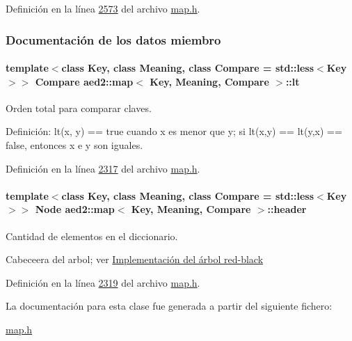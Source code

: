 \-Definición en la línea \hyperlink{map_8h_source_l02573}{2573} del archivo \hyperlink{map_8h_source}{map.\-h}.



\subsubsection{\-Documentación de los datos miembro}
\hypertarget{classaed2_1_1map_a0e5be36fae0693e4665bd2a615e7550a_a0e5be36fae0693e4665bd2a615e7550a}{
\paragraph[{lt}]{\setlength{\rightskip}{0pt plus 5cm}template$<$class \-Key, class \-Meaning, class \-Compare = std\-::less$<$\-Key$>$$>$ \-Compare {\bf aed2\-::map}$<$ \-Key, \-Meaning, \-Compare $>$\-::{\bf lt}}}\label{classaed2_1_1map_a0e5be36fae0693e4665bd2a615e7550a_a0e5be36fae0693e4665bd2a615e7550a}


\-Orden total para comparar claves. 

\-Definición\-: lt(x, y) == true cuando x es menor que y; si lt(x,y) == lt(y,x) == false, entonces x e y son iguales. 

\-Definición en la línea \hyperlink{map_8h_source_l02317}{2317} del archivo \hyperlink{map_8h_source}{map.\-h}.

\hypertarget{classaed2_1_1map_a92d93f905c8ad73fba18fdc7e8915cce_a92d93f905c8ad73fba18fdc7e8915cce}{
\paragraph[{header}]{\setlength{\rightskip}{0pt plus 5cm}template$<$class \-Key, class \-Meaning, class \-Compare = std\-::less$<$\-Key$>$$>$ {\bf \-Node} {\bf aed2\-::map}$<$ \-Key, \-Meaning, \-Compare $>$\-::{\bf header}}}\label{classaed2_1_1map_a92d93f905c8ad73fba18fdc7e8915cce_a92d93f905c8ad73fba18fdc7e8915cce}


\-Cantidad de elementos en el diccionario. 

\-Cabeceera del arbol; ver \hyperlink{Implementacion}{\-Implementación del árbol red-\/black} 

\-Definición en la línea \hyperlink{map_8h_source_l02319}{2319} del archivo \hyperlink{map_8h_source}{map.\-h}.



\-La documentación para esta clase fue generada a partir del siguiente fichero\-:\begin{DoxyCompactItemize}
\item 
\hyperlink{map_8h}{map.\-h}\end{DoxyCompactItemize}
